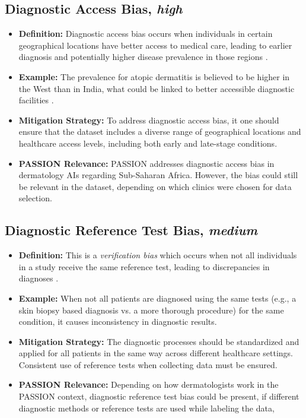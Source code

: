\documentclass[12pt, a4paper, oneside]{book}   	%
\begin{document}
\begin{appendices}
		\subsection{Diagnostic Access Bias, \textit{high}}
		\begin{itemize}
			\item \textbf{Definition:} Diagnostic access bias occurs when individuals in certain geographical locations have better access to medical care, leading to earlier diagnosis and potentially higher disease prevalence in those regions \autocite{Chakraborty_2024}.
			\item \textbf{Example:} The prevalence for atopic dermatitis is believed to be higher in the West than in India, what could be linked to better accessible diagnostic facilities \autocite{Chakraborty_2024}.
			\item \textbf{Mitigation Strategy:} To address diagnostic access bias, it one should ensure that the dataset includes a diverse range of geographical locations and healthcare access levels, including both early and late-stage conditions.
			\item \textbf{PASSION Relevance:} PASSION addresses diagnostic access bias in dermatology \glspl{AI} regarding Sub-Saharan Africa. However, the bias could still be relevant in the dataset, depending on which clinics were chosen for data selection.
		\end{itemize}
		
		\subsection{Diagnostic Reference Test Bias, \textit{medium}}
		\begin{itemize}
			\item \textbf{Definition:} This is a \textit{verification bias} which occurs when not all individuals in a study receive the same reference test, leading to discrepancies in diagnoses \autocite{Chakraborty_2024}.
			\item \textbf{Example:} When not all patients are diagnosed using the same tests (e.g., a skin biopsy based diagnosis vs. a more thorough procedure) for the same condition, it causes inconsistency in diagnostic results.
			\item \textbf{Mitigation Strategy:} The diagnostic processes should be standardized and applied for all patients in the same way across different healthcare settings. Consistent use of reference tests when collecting data must be ensured.
			\item \textbf{PASSION Relevance:} Depending on how dermatologists work in the PASSION context, diagnostic reference test bias could be present, if different diagnostic methods or reference tests are used while labeling the data,
		\end{itemize}
		

\end{appendices}
\end{document}
